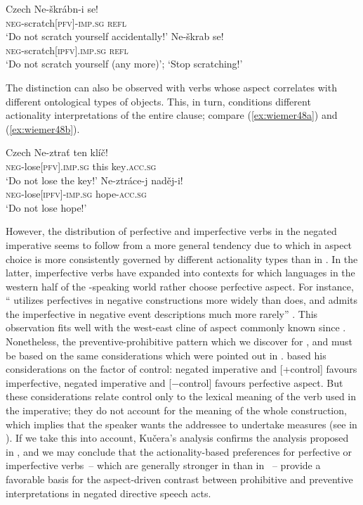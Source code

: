 \documentclass[output=paper,colorlinks,citecolor=brown]{langscibook}
\begin{document}
\ea \textnormal{Czech}
\label{ex:wiemer47}
\ea \label{ex:wiemer47a}
\gll Ne-škrábn-i se! \\
\textsc{neg}-scratch\textsc{[pfv]-imp.sg} \textsc{refl} \\
\glt `Do not scratch yourself accidentally!'
\ex \label{ex:wiemer47b}
\gll Ne-škrab se! \\
\textsc{neg}-scratch\textsc{[ipfv].imp.sg} \textsc{refl} \\
\glt `Do not scratch yourself (any more)'; `Stop scratching!'
\z
\z


 The distinction can also be observed with verbs whose aspect correlates with different ontological types of objects. This, in turn, conditions different actionality interpretations of the entire clause; compare (\ref{ex:wiemer48a}) and (\ref{ex:wiemer48b}).

\newpage
\ea \textnormal{Czech}
\label{ex:wiemer48} 
\ea \label{ex:wiemer48a}
\gll Ne-ztrať ten klíč! \\
\textsc{neg}-lose\textsc{[pfv].imp.sg} this key\textsc{.acc.sg} \\
\glt `Do not lose the key!'
\ex \label{ex:wiemer48b}
\gll Ne-ztráce-j naděj-i! \\
\textsc{neg}-lose\textsc{[ipfv]-imp.sg} hope-\textsc{acc.sg} \\
\glt `Do not lose hope!'
\z
\z


 However, the distribution of perfective and imperfective verbs in the negated imperative seems to follow from a more general tendency due to which in  aspect choice is more consistently governed by different actionality types than in . In the latter, imperfective verbs have expanded into contexts for which languages in the western half of the -speaking world rather choose perfective aspect. For instance, `` utilizes perfectives in negative constructions more widely than  does, and admits the imperfective in negative event descriptions much more rarely'' \citep[118]{Kučera1984}. This observation fits well with the west-east cline of  aspect commonly known since \citet{Dickey2000}. Nonetheless, the preventive-prohibitive pattern which we discover for ,  and  must be based on the same considerations which were pointed out in . \citet{Kučera1984} based his considerations on the factor of control: negated imperative and [+control] favours imperfective, negated imperative and [−control] favours perfective aspect. But these considerations relate control only to the lexical meaning of the verb used in the imperative; they do not account for the meaning of the whole construction, which implies that the speaker wants the addressee to undertake measures (see  in ). If we take this into account, Kučera's analysis confirms the analysis proposed in , and we may conclude that the actionality-based preferences for perfective or imperfective verbs~– which are generally stronger in  than in ~– provide a favorable basis for the aspect-driven contrast between prohibitive and preventive interpretations in negated directive speech acts.
\end{document}
